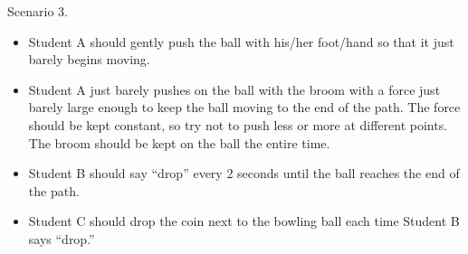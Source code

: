 \documentclass[answers]{exam}
\begin{document}
\begin{questions}

\question 
Scenario 3.

\begin{itemize}[itemsep=0pt,topsep=0pt]
    \item Student A should gently push the ball with his/her foot/hand so that it just barely begins moving.
    \item Student A just barely pushes on the ball with the broom with a force just barely large enough to keep the ball moving to the end of the path. The force should be kept constant, so try not to push less or more at different points.  The broom should be kept on the ball the entire time.
    \item Student B should say ``drop'' every 2 seconds until the ball reaches the end of the path.
    \item Student C should drop the coin next to the bowling ball each time Student B says ``drop.''
\end{itemize}

\medskip

\end{questions}
\end{document}
